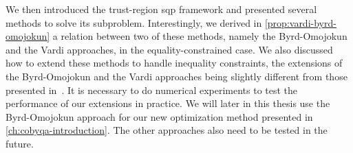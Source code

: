 We then introduced the trust-region \gls{sqp} framework and presented several methods to solve its subproblem.
Interestingly, we derived in \cref{prop:vardi-byrd-omojokun} a relation between two of  these methods, namely the Byrd-Omojokun and the Vardi approaches, in the equality-constrained case.
We also discussed how to extend these methods to handle inequality constraints, the extensions of the Byrd-Omojokun and the Vardi approaches being slightly different from those presented in~\cite[\S~15.4]{Conn_Gould_Toint_2000}.
It is necessary to do numerical experiments to test the performance of our extensions in practice.
We will later in this thesis use the Byrd-Omojokun approach for our new optimization method presented in \cref{ch:cobyqa-introduction}.
The other approaches also need to be tested in the future.
